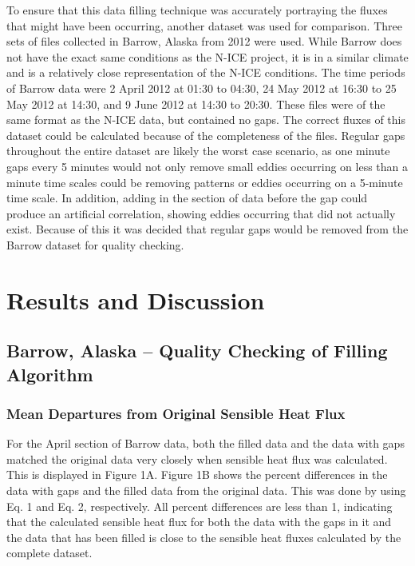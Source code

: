 To ensure that this data filling technique was accurately portraying the fluxes that might have been occurring, another dataset was used for comparison. Three sets of files collected in Barrow, Alaska from 2012 were used. While Barrow does not have the exact same conditions as the N-ICE project, it is in a similar climate and is a relatively close representation of the N-ICE conditions. The time periods of Barrow data were 2 April 2012 at 01:30 to 04:30, 24 May 2012 at 16:30 to 25 May 2012 at 14:30, and 9 June 2012 at 14:30 to 20:30. These files were of the same format as the N-ICE data, but contained no gaps.  The correct fluxes of this dataset could be calculated because of the completeness of the files. Regular gaps throughout the entire dataset are likely the worst case scenario, as one minute gaps every 5 minutes would not only remove small eddies occurring on less than a minute time scales could be removing patterns or eddies occurring on a 5-minute time scale. In addition, adding in the section of data before the gap could produce an artificial correlation, showing eddies occurring that did not actually exist. Because of this it was decided that regular gaps would be removed from the Barrow dataset for quality checking. 

\section{Results and Discussion}
\subsection{Barrow, Alaska – Quality Checking of Filling Algorithm}
\subsubsection{Mean Departures from Original Sensible Heat Flux}

For the April section of Barrow data, both the filled data and the data with gaps matched the original data very closely when sensible heat flux was calculated. This is displayed in Figure 1A. Figure 1B shows the percent differences in the data with gaps and the filled data from the original data. This was done by using Eq. 1 and Eq. 2, respectively. All percent differences are less than 1, indicating that the calculated sensible heat flux for both the data with the gaps in it and the data that has been filled is close to the sensible heat fluxes calculated by the complete dataset.

